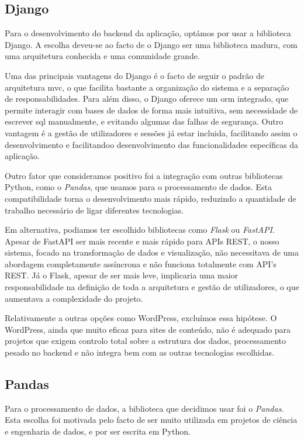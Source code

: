 \subsection{Django}

Para o desenvolvimento do backend da aplicação, optámos por usar a biblioteca Django. A escolha deveu-se ao facto de o Django ser uma biblioteca madura, com uma arquitetura conhecida e uma comunidade grande.

Uma das principais vantagens do Django é o facto de seguir o padrão de arquitetura \gls{mvc}, o que facilita bastante a organização do sistema e a separação de responsabilidades. Para além disso, o Django oferece um \gls{orm} integrado, que permite interagir com bases de dados de forma mais intuitiva, sem necessidade de escrever \gls{sql} manualmente, e evitando algumas das falhas de segurança. Outro vantagem é a gestão de utilizadores e sessões já estar incluida, facilitando assim o desenvolvimento e facilitandoo desenvolvimento das funcionalidades específicas da aplicação.

Outro fator que consideramos positivo foi a integração  com outras bibliotecas Python, como o \textit{Pandas}, que usamos para o processamento de dados. Esta compatibilidade torna o desenvolvimento mais rápido, reduzindo a quantidade de trabalho necessário de ligar diferentes tecnologias.

Em alternativa, podiamos ter escolhido bibliotecas como \textit{Flask} ou \textit{FastAPI}. Apesar de FastAPI ser mais recente e mais rápido para APIs REST, o nosso sistema, focado na transformação de dados e visualização, não necessitava de uma abordagem completamente assíncrona e não funciona totalmente com API's REST. Já o Flask, apesar de ser mais leve, implicaria uma maior responsabilidade na definição de toda a arquitetura e gestão de utilizadores, o que aumentava a complexidade do projeto.

Relativamente a outras opções como WordPress, excluímos essa hipótese. O WordPress, ainda que muito eficaz para sites de conteúdo, não é adequado para projetos que exigem controlo total sobre a estrutura dos dados, processamento pesado no backend e não integra bem com as outras tecnologias escolhidas.

\subsection{Pandas}

Para o processamento de dados, a biblioteca que decidimos usar foi o \textit{Pandas}. Esta escolha foi motivada pelo facto de ser muito utilizada em projetos de ciência e engenharia de dados, e por ser escrita em Python.

